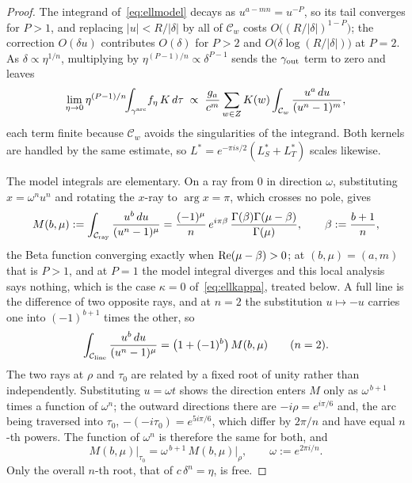 \documentclass[11pt]{article}
\begin{document}
\begin{proof}
The integrand of~\eqref{eq:ellmodel} decays as $u^{a-mn}=u^{-P}$, so its tail converges for $P>1$,
and replacing $|u|<R/|\delta|$ by all of $\mathcal{C}_w$ costs $O\big((R/|\delta|)^{1-P}\big)$; the
correction $O(\delta u)$ contributes $O(\delta)$ for $P>2$ and $O\big(\delta\log(R/|\delta|)\big)$
at $P=2$. As $\delta\propto\eta^{1/n}$, multiplying by $\eta^{(P-1)/n}\propto\delta^{P-1}$ sends
the $\gamma_{\rm out}$ term to zero and leaves
\begin{equation}\label{eq:elllimit}
\lim_{\eta\to0}\eta^{(P-1)/n}\!\!\int_{\gamma^{\rm arc}}\!f_\eta\,K\,d\tau
\;\propto\;\frac{g_a}{c^{m}}\sum_{w\in Z}K(w)\int_{\mathcal{C}_w}\frac{u^{a}\,du}{(u^{n}-1)^{m}} ,
\end{equation}
each term finite because $\mathcal{C}_w$ avoids the singularities of the integrand. Both kernels
are handled by the same estimate, so $L^*=e^{-\pi is/2}(L^*_S+L^*_T)$ scales likewise.

The model integrals are elementary. On a ray from $0$ in direction $\omega$, substituting
$x=\omega^{n}u^{n}$ and rotating the $x$-ray to $\arg x=\pi$, which crosses no pole, gives
\begin{equation}\label{eq:raymodel}
M(b,\mu):=\int_{\mathcal{C}_{\rm ray}}\frac{u^{b}\,du}{(u^{n}-1)^{\mu}}
=\frac{(-1)^{\mu}}{n}\,e^{i\pi\beta}\,\frac{\Gamma(\beta)\Gamma(\mu-\beta)}{\Gamma(\mu)},
\qquad \beta:=\frac{b+1}{n},
\end{equation}
the Beta function
converging exactly when ${\rm Re}(\mu-\beta)>0$; at $(b,\mu)=(a,m)$ that is $P>1$, and at $P=1$
the model integral diverges and this local analysis says nothing, which is the case $\kappa=0$
of~\eqref{eq:ellkappa}, treated below. A full line is the difference of two opposite rays, and at
$n=2$ the substitution $u\mapsto-u$ carries one into $(-1)^{b+1}$ times the other, so
\begin{equation}\label{eq:linemodel}
\int_{\mathcal{C}_{\rm line}}\frac{u^{b}\,du}{(u^{n}-1)^{\mu}}
=\big(1+(-1)^{b}\big)\,M(b,\mu)\qquad(n=2).
\end{equation}
The two rays at $\rho$ and $\tau_0$ are related by a fixed root of unity rather than
independently. Substituting $u=\omega t$ shows the direction enters $M$ only as
$\omega^{\,b+1}$ times a function of $\omega^{n}$; the outward directions there are
$-i\rho=e^{i\pi/6}$ and, the arc being traversed into $\tau_0$, $-(-i\tau_0)=e^{5i\pi/6}$, which
differ by $2\pi/n$ and have equal $n$-th powers. The function of $\omega^n$ is therefore the same
for both, and
\begin{equation}\label{eq:relroot}
M(b,\mu)\Big|_{\tau_0}=\omega^{\,b+1}\,M(b,\mu)\Big|_{\rho},\qquad \omega:=e^{2\pi i/n}.
\end{equation}
Only the overall $n$-th root, that of $c\,\delta^{n}=\eta$, is free.


\end{proof}
\end{document}
